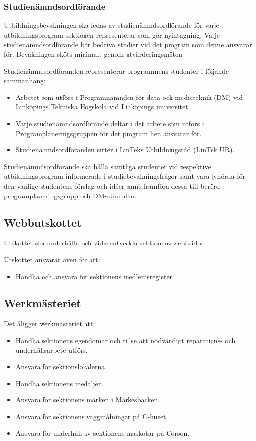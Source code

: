 \documentclass{datateknologsektionen-document}
\begin{document}
\subsubsection{Studienämndsordförande}
Utbildningsbevakningen ska ledas av studienämndsordförande för varje utbildningsprogram
sektionen representerar som gör nyintagning. Varje studienämndsordförande bör bedriva
studier vid det program som denne ansvarar för. Bevakningen sköts minimalt genom utvärderingsmöten

Studienämndsordföranden representerar programmens studenter i följande sammanhang:
\begin{itemize}
  \item Arbetet som utförs i Programnämnden för data-och medieteknik (DM) vid Linköpings Tekniska Högskola vid Linköpings universitet.
  \item Varje studienämndsordförande deltar i det arbete som utförs i Programplaneringsgruppen för det program hen ansvarar för.
  \item Studienämndsordföranden sitter i LinTeks Utbildningsråd (LinTek UR).
\end{itemize}

Studienämndsordförande ska hålla samtliga studenter vid respektive utbildningsprogram
informerade i studiebevakningsfrågor samt vara lyhörda för den vanlige studentens
förslag och idéer samt framföra dessa till berörd programplaneringsgrupp och DM-nämnden.

\subsection{Webbutskottet}
Utskottet ska underhålla och vidareutveckla sektionens webbsidor.

Utskottet ansvarar även för att:
\begin{itemize}
  \item Handha och ansvara för sektionens medlemsregister.
\end{itemize}

\subsection{Werkmästeriet}
Det åligger werkmästeriet att:
\begin{itemize}
  \item Handha sektionens egendomar och tillse att nödvändigt reparations- och underhållsarbete utförs.
  \item Ansvara för sektionslokalerna.
  \item Handha sektionens medaljer.
  \item Ansvara för sektionens märken i Märkesbacken.
  \item Ansvara för sektionens väggmålningar på C-huset.
  \item Ansvara för underhåll av sektionens maskotar på Corson.
\end{itemize}
\end{document}
